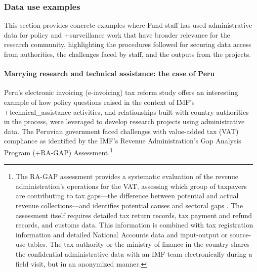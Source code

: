 \documentclass[
]{WileySix}
\begin{document}
\hypertarget{data-use-examples-8}{%
\subsubsection{Data use examples}\label{data-use-examples-8}}

This section provides concrete examples where Fund staff has used administrative data for policy and +surveillance\textbar{} work that have broader relevance for the research community, highlighting the procedures followed for securing data access from authorities, the challenges faced by staff, and the outputs from the projects.

\hypertarget{marrying-research-and-technical-assistance-the-case-of-peru}{%
\paragraph{Marrying research and technical assistance: the case of Peru}\label{marrying-research-and-technical-assistance-the-case-of-peru}}

Peru's electronic invoicing (e-invoicing) tax reform study offers an interesting example of how policy questions raised in the context of IMF's +technical\_assistance\textbar{} activities, and relationships built with country authorities in the process, were leveraged to develop research projects using administrative data. The Peruvian government faced challenges with value-added tax (VAT) compliance as identified by the IMF's Revenue Administration's Gap Analysis Program (+RA-GAP\textbar) Assessment.\footnote{The RA-GAP assessment provides a systematic evaluation of the revenue administration's operations for the VAT, assessing which group of taxpayers are contributing to tax gaps---the difference between potential and actual revenue collections---and identifies potential causes and sectoral gaps \citep{hutton2017}. The assessment itself requires detailed tax return records, tax payment and refund records, and customs data. This information is combined with tax registration information and detailed National Accounts data and input-output or source-use tables. The tax authority or the ministry of finance in the country shares the confidential administrative data with an IMF team electronically during a field visit, but in an anonymized manner.}
\end{document}
